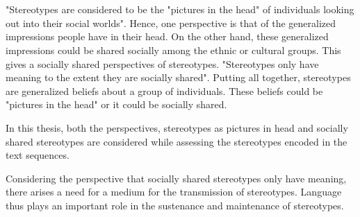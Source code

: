 \\
\\
"Stereotypes are considered to be the "pictures in the head" of individuals looking out into their social worlds"\cite{macrae1996stereotypes}. Hence, one perspective is that of the generalized impressions people have in their head. On the other hand, these generalized impressions could be shared socially among the ethnic or cultural groups. This gives a socially shared perspectives of stereotypes. "Stereotypes only have meaning to the extent they are socially shared"\cite{macrae1996stereotypes}. Putting all together, stereotypes are generalized beliefs about a group of individuals. These beliefs could be "pictures in the head" or it could be socially shared. 

In this thesis, both the perspectives, stereotypes as pictures in head and socially shared stereotypes are considered while assessing the stereotypes encoded in the text sequences.


Considering the perspective that socially shared stereotypes only have meaning, there arises a need for a medium for the transmission of stereotypes. Language thus plays an important role in the sustenance and maintenance of stereotypes\cite{macrae1996stereotypes}.



